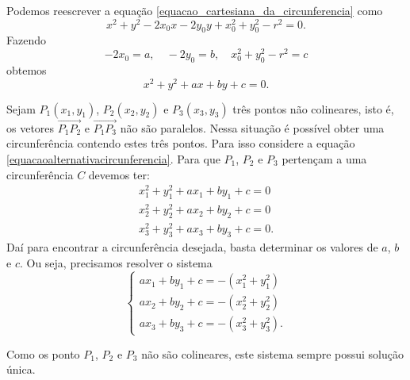 Podemos reescrever a equação \eqref{equacao_cartesiana_da_circunferencia} como
\[
    x^2 + y^2 - 2x_0x - 2y_0y + x_0^2 + y_0^2 - r^2 = 0.
\]
Fazendo
\[
    -2x_0 = a,\quad -2y_0 = b,\quad x_0^2 + y_0^2 - r^2 = c
\]
obtemos
\begin{equation}\label{equacaoalternativacircunferencia}
    x^2 + y^2 + ax + by + c = 0.
\end{equation}

Sejam $P_1(x_1,y_1)$, $P_2(x_2,y_2)$ e $P_3(x_3,y_3)$ três pontos não colineares, isto é, os vetores $\vec{P_1P_2}$ e $\vec{P_1P_3}$ não são paralelos.
Nessa situação é possível obter uma circunferência contendo estes três pontos. Para isso considere a equação \eqref{equacaoalternativacircunferencia}.
Para que $P_1$, $P_2$ e $P_3$ pertençam a uma circunferência $C$ devemos ter:
\begin{align*}
    x_1^2 + y_1^2 + ax_1 + by_1 + c = 0 \\
    x_2^2 + y_2^2 + ax_2 + by_2 + c = 0 \\
    x_3^2 + y_3^2 + ax_3 + by_3 + c = 0.
\end{align*}
Daí para encontrar a circunferência desejada, basta determinar os valores de $a$, $b$ e $c$. Ou seja, precisamos resolver o sistema
\[
    \begin{cases}
        ax_1 + by_1 + c = -(x_1^2 + y_1^2) \\
        ax_2 + by_2 + c = -(x_2^2 + y_2^2) \\
        ax_3 + by_3 + c = -(x_3^2 + y_3^2).
    \end{cases}
\]

Como os ponto $P_1$, $P_2$ e $P_3$ não são colineares, este sistema sempre possui solução única.

